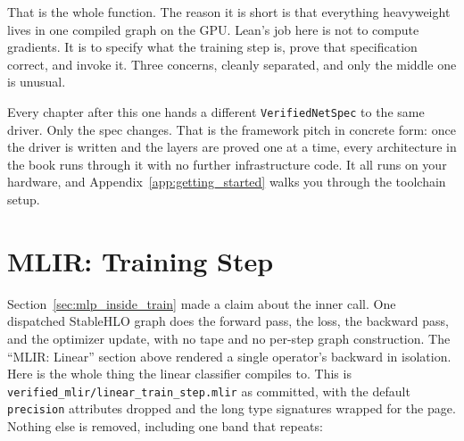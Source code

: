 That is the whole function. The reason it is short is that everything
heavyweight lives in one compiled graph on the GPU. Lean's job here is
not to compute gradients. It is to specify what the training step is,
prove that specification correct, and invoke it. Three concerns, cleanly
separated, and only the middle one is unusual.

Every chapter after this one hands a different \texttt{VerifiedNetSpec}
to the same driver. Only the spec changes. That is the framework pitch
in concrete form: once the driver is written and the layers are proved
one at a time, every architecture in the book runs through it with no
further infrastructure code. It all runs on your hardware, and
Appendix~\ref{app:getting_started} walks you through the toolchain
setup.
\section{MLIR: Training Step}
\label{sec:mlir_training_step}

Section~\ref{sec:mlp_inside_train} made a claim about the inner call. One
dispatched StableHLO graph does the forward pass, the loss, the backward
pass, and the optimizer update, with no tape and no per-step graph
construction. The ``MLIR: Linear'' section
above rendered a single operator's backward in isolation. Here is the
whole thing the linear classifier compiles to. This is
\texttt{verified\_mlir/linear\_train\_step.mlir} as committed, with the
default \texttt{precision} attributes dropped and the long type
signatures wrapped for the page. Nothing else is removed, including one
band that repeats:

